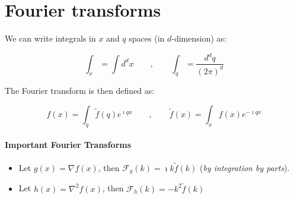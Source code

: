 \documentclass[11pt]{article} %
\newcommand{\1}{{\rm 1\hspace*{-0.38ex}%
\rule{0.1ex}{1.52ex}\hspace*{0.2ex}}}
\begin{document}
\section{Fourier transforms} \label{fourierTrans}


We can write integrals in $x$ and $q$ spaces (in $d$-dimension) as:

\begin{equation}
\int_x = \int d^d x \qquad , \qquad \int_q = \frac{d^d q}{(2 \pi)^d}
\end{equation}

The Fourier transform is then defined as:

\begin{equation}
f(x) = \int_q \tilde{f}(q) e^{\imath q x}  \qquad , \qquad \tilde{f}(x) = \int_x f(x) e^{-\imath q x} 
\end{equation}

\begin{tcolorbox}[colback=blue!5!white,colframe=blue!75!blue]
\paragraph{Important Fourier Transforms}
\begin{itemize}
\item Let $g(x) = \nabla f(x)$, then $\mathcal{F}_g (k) = \imath k \tilde{f}(k)$ (\textit{by integration by parts}).
\item Let $h(x) = \nabla^2 f(x)$, then $\mathcal{F}_h (k) = - k^2 \tilde{f}(k)$
\end{itemize}
\end{tcolorbox}
\end{document}
